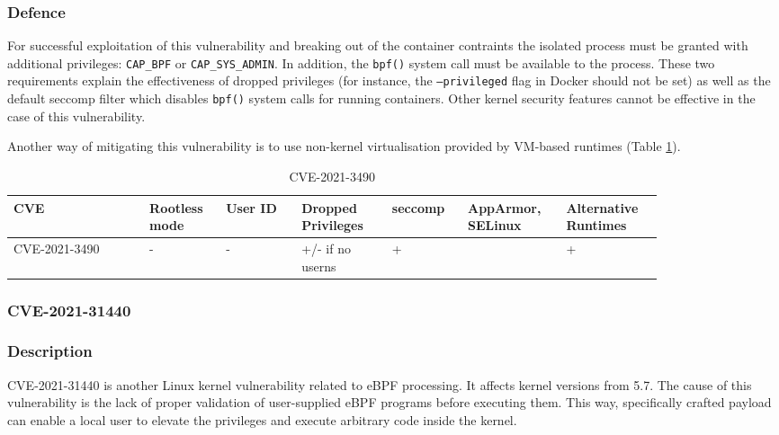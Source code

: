 \subsubsection*{Defence}

For successful exploitation of this vulnerability and breaking out of the container contraints the isolated process must be granted with additional privileges: \texttt{CAP\_BPF} or \texttt{CAP\_SYS\_ADMIN}. In addition, the \texttt{bpf()} system call must be available to the process. These two requirements explain the effectiveness of dropped privileges (for instance, the \texttt{--privileged} flag in Docker should not be set) as well as the default seccomp filter which disables \texttt{bpf()} system calls for running containers. Other kernel security features cannot be effective in the case of this vulnerability.

Another way of mitigating this vulnerability is to use non-kernel virtualisation provided by VM-based runtimes (Table \ref{tab:h:4}).


\begin{table}[H]
    \centering \small
    \begin{tabular}{| p{0.18\linewidth} | p{0.1\linewidth} | p{0.1\linewidth} | p{0.12\linewidth} | p{0.1\linewidth} | p{0.12\linewidth} | p{0.12\linewidth} |} \hline
    CVE & Rootless mode & User ID & Dropped Privileges & seccomp & AppArmor, SELinux & Alternative Runtimes \\ \hline
    CVE-2021-3490 & - & - & \cellcolor{yellow!25} +/- \linebreak if no userns & \cellcolor{green!25} + &  & \cellcolor{green!25} + \\ \hline
    \end{tabular}
    \caption{CVE-2021-3490}
    \label{tab:h:4}
\end{table}



\subsubsection{CVE-2021-31440}
\subsubsection*{Description}

CVE-2021-31440 is another Linux kernel vulnerability related to eBPF processing. It affects kernel versions from 5.7. The cause of this vulnerability is the lack of proper validation of user-supplied eBPF programs before executing them. This way, specifically crafted payload can enable a local user to elevate the privileges and execute arbitrary code inside the kernel.


